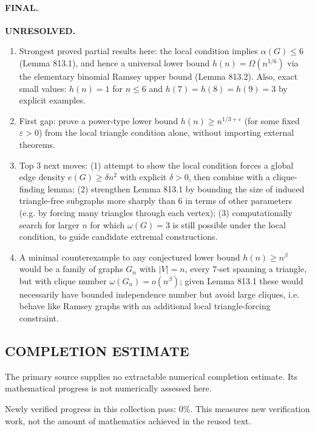 \paragraph{FINAL.} \textbf{UNRESOLVED.}
\begin{enumerate}
\item[(i)] Strongest proved partial results here: the local condition implies $\alpha(G)\le6$ (Lemma 813.1), and hence a universal lower bound $h(n)=\Omega(n^{1/6})$ via the elementary binomial Ramsey upper bound (Lemma 813.2). Also, exact small values: $h(n)=1$ for $n\le6$ and $h(7)=h(8)=h(9)=3$ by explicit examples.
\item[(ii)] First gap: prove a power-type lower bound $h(n)\ge n^{1/3+\varepsilon}$ (for some fixed $\varepsilon>0$) from the local triangle condition alone, without importing external theorems.
\item[(iii)] Top 3 next moves: (1) attempt to show the local condition forces a global edge density $e(G)\ge \delta n^2$ with explicit $\delta>0$, then combine with a clique-finding lemma; (2) strengthen Lemma 813.1 by bounding the size of induced triangle-free subgraphs more sharply than $6$ in terms of other parameters (e.g. by forcing many triangles through each vertex); (3) computationally search for larger $n$ for which $\omega(G)=3$ is still possible under the local condition, to guide candidate extremal constructions.
\item[(iv)] A minimal counterexample to any conjectured lower bound $h(n)\ge n^{\beta}$ would be a family of graphs $G_n$ with $|V|=n$, every $7$-set spanning a triangle, but with clique number $\omega(G_n)=o(n^{\beta})$; given Lemma 813.1 these would necessarily have bounded independence number but avoid large cliques, i.e. behave like Ramsey graphs with an additional local triangle-forcing constraint.
\end{enumerate}




\subsection*{COMPLETION ESTIMATE}
The primary source supplies no extractable numerical completion estimate. Its mathematical progress is not numerically assessed here.

Newly verified progress in this collection pass: $0\%$. This measures new verification work, not the amount of mathematics achieved in the reused text.
